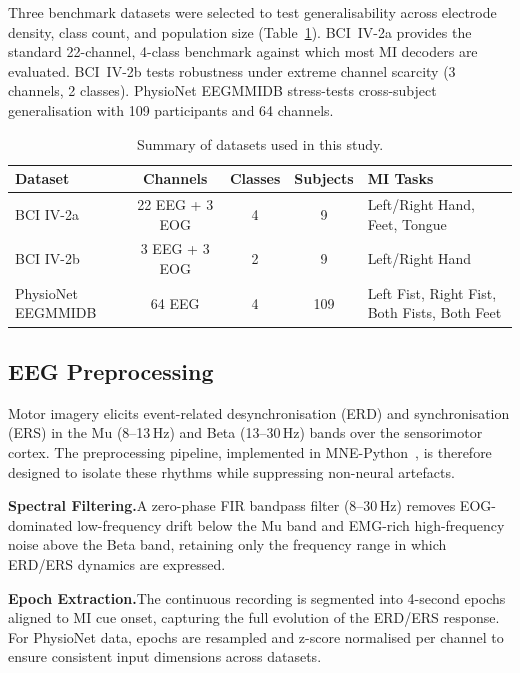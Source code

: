 \documentclass[12pt, a4paper]{article}
\begin{document}
Three benchmark datasets were selected to test generalisability across electrode density, class count, and population size (Table~\ref{tab:datasets}). BCI~IV-2a provides the standard 22-channel, 4-class benchmark against which most MI decoders are evaluated. BCI~IV-2b tests robustness under extreme channel scarcity (3 channels, 2 classes). PhysioNet EEGMMIDB stress-tests cross-subject generalisation with 109 participants and 64 channels.

\begin{table}[htbp]
\centering
\caption{Summary of datasets used in this study.}
\label{tab:datasets}
\begin{tabular}{lcccl}
\toprule
\textbf{Dataset} & \textbf{Channels} & \textbf{Classes} & \textbf{Subjects} & \textbf{MI Tasks} \\
\midrule
BCI IV-2a & 22 EEG + 3 EOG & 4 & 9 & Left/Right Hand, Feet, Tongue \\
BCI IV-2b & 3 EEG + 3 EOG & 2 & 9 & Left/Right Hand \\
PhysioNet EEGMMIDB & 64 EEG & 4 & 109 & Left Fist, Right Fist, Both Fists, Both Feet \\
\bottomrule
\end{tabular}
\end{table}

\subsection{EEG Preprocessing}

Motor imagery elicits event-related desynchronisation (ERD) and synchronisation (ERS) in the Mu (8--13\,Hz) and Beta (13--30\,Hz) bands over the sensorimotor cortex. The preprocessing pipeline, implemented in MNE-Python~\cite{gramfort2013mne}, is therefore designed to isolate these rhythms while suppressing non-neural artefacts.

\textbf{Spectral Filtering.}\quad A zero-phase FIR bandpass filter (8--30\,Hz) removes EOG-dominated low-frequency drift below the Mu band and EMG-rich high-frequency noise above the Beta band, retaining only the frequency range in which ERD/ERS dynamics are expressed.

\textbf{Epoch Extraction.}\quad The continuous recording is segmented into 4-second epochs aligned to MI cue onset, capturing the full evolution of the ERD/ERS response. For PhysioNet data, epochs are resampled and z-score normalised per channel to ensure consistent input dimensions across datasets.
\end{document}
